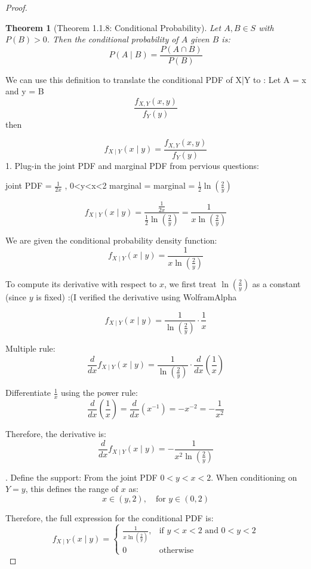 \documentclass[12pt]{amsart}
\newtheorem{thm}{Theorem}
\theoremstyle{remark}
\numberwithin{equation}{section} \numberwithin{thm}{section}
\numberwithin{rmk}{section} \numberwithin{figure}{section}
\begin{document}
\begin{proof}

\begin{thm}[Theorem 1.1.8: Conditional Probability]
Let \( A, B \in S \) with \( P(B) > 0 \). Then the conditional probability of \( A \) given \( B \) is:
\[
P(A \mid B) = \frac{P(A \cap B)}{P(B)}
\]
\end{thm}
We can use this definition to translate the conditional PDF of X|Y to : Let A = x and y = B
\[
\frac{f_{X,Y}(x, y)}{f_Y(y)}
\]
then

\[
f_{X \mid Y}(x \mid y) = \frac{f_{X,Y}(x, y)}{f_Y(y)}
\]
1. Plug-in the joint PDF and marginal PDF from pervious questions:

joint PDF = $\frac{1}{2x}$ , 0<y<x<2
marginal = marginal = $\frac{1}{2} \ln\left( \frac{2}{y} \right)$


\[
f_{X \mid Y}(x \mid y) = \frac{\frac{1}{2x}}{\frac{1}{2} \ln\left( \frac{2}{y} \right)} = \frac{1}{x \ln\left( \frac{2}{y} \right)}
\]


We are given the conditional probability density function:
\[
f_{X \mid Y}(x \mid y) = \frac{1}{x \ln\left( \frac{2}{y} \right)}
\]

To compute its derivative with respect to \( x \), we first treat \( \ln\left( \frac{2}{y} \right) \) as a constant (since \( y \) is fixed) :(I verified the derivative using WolframAlpha

\[
f_{X \mid Y}(x \mid y) = \frac{1}{\ln\left( \frac{2}{y} \right)} \cdot \frac{1}{x}
\]

Multiple rule:
\[
\frac{d}{dx} f_{X \mid Y}(x \mid y) = \frac{1}{\ln\left( \frac{2}{y} \right)} \cdot \frac{d}{dx}\left( \frac{1}{x} \right)
\]

Differentiate \( \frac{1}{x} \) using the power rule:
\[
\frac{d}{dx}\left( \frac{1}{x} \right) = \frac{d}{dx}(x^{-1}) = -x^{-2} = -\frac{1}{x^2}
\]

Therefore, the derivative is:
\[
\frac{d}{dx} f_{X \mid Y}(x \mid y) = -\frac{1}{x^2 \ln\left( \frac{2}{y} \right)}
\]


. Define the support: From the joint PDF \( 0 < y < x < 2 \). When conditioning on \( Y = y \), this defines the range of \( x \) as:
\[
x \in (y, 2), \quad \text{for } y \in (0, 2)
\]

\noindent
Therefore, the full expression for the conditional PDF is:
\[
f_{X \mid Y}(x \mid y) =
\begin{cases}
\displaystyle \frac{1}{x \ln\left( \frac{2}{y} \right)}, & \text{if } y < x < 2 \text{ and } 0 < y < 2 \\
0 & \text{otherwise}
\end{cases}
\]





\end{proof}
\end{document}

